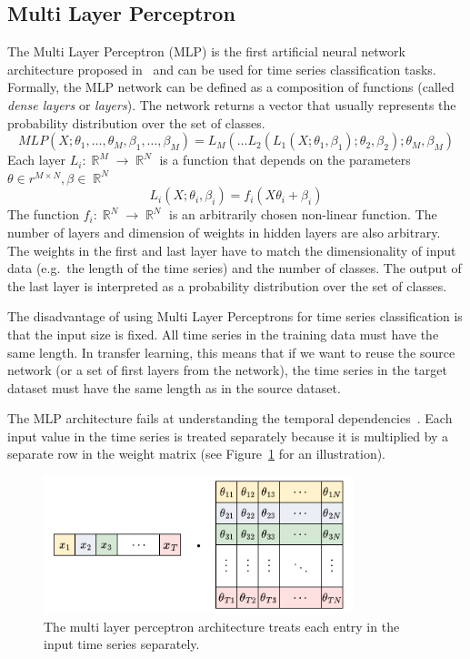 \documentclass[a4paper,11pt,twoside]{report}
\theoremstyle{definition}
\DeclareMathOperator{\real}{\mathbb{R}}
\begin{document}
\subsection{Multi Layer Perceptron}\label{mlp_section_related}
The Multi Layer Perceptron (MLP) is the first artificial neural network architecture proposed in~\cite{dl_tsc} and can be used for time series classification tasks.
Formally, the MLP network can be defined as a composition of functions (called \textit{dense layers} or \textit{layers}). The network returns a vector that usually represents the probability distribution over the set of classes.
$$MLP(X; \theta_1,\dots , \theta_M, \beta_1,\dots , \beta_M) = L_M(\dots L_2(L_1(X;\theta_1, \beta_1);\theta_2, \beta_2);\theta_M, \beta_M)$$
Each layer $L_i: \real^M \rightarrow \real^N$ is a function that depends on the parameters $\theta \in r^{M\times N}, \beta \in \real^N$
$$L_i(X ; \theta_i, \beta_i) = f_i(X \theta_i  + \beta_i)$$
The function $f_i: \real^N \rightarrow \real^N$ is an arbitrarily chosen non-linear function. The number of layers and dimension of weights in hidden layers are also arbitrary. The weights in the first and last layer have to match the dimensionality of input data (e.g.~the length of the time series) and the number of classes. The output of the last layer is interpreted as a probability distribution over the set of classes.

The disadvantage of using Multi Layer Perceptrons for time series classification is that the input size is fixed. All time series in the training data must have the same length. In transfer learning, this means that if we want to reuse the source network (or a set of first layers from the network), the time series in the target dataset must have the same length as in the source dataset.

The MLP architecture fails at understanding the temporal dependencies~\cite{dl_tsc}. Each input value in the time series is treated separately because it is multiplied by a separate row in the weight matrix (see Figure~\ref{fig:mlp_multiplication} for an illustration).
\begin{figure}
\centering
\label{fig:mlp_multiplication}
\includegraphics[height=4cm]{imgs/MLP_multiplication_v2.png}
\caption{The multi layer perceptron architecture treats each entry in the input time series separately.}
\end{figure}
\end{document}
